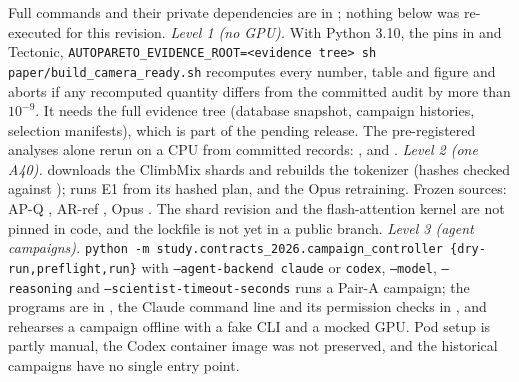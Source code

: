 Full commands and their private dependencies are in ; nothing below was re-executed for this revision.
\emph{Level 1 (no GPU).} With Python 3.10, the pins in  and Tectonic, \texttt{AUTOPARETO\_EVIDENCE\_ROOT=<evidence tree> sh paper/build\_camera\_ready.sh} recomputes every number, table and figure and aborts if any recomputed quantity differs from the committed audit by more than $10^{-9}$. It needs the full evidence tree (database snapshot, campaign histories, selection manifests), which is part of the pending release. The pre-registered analyses alone rerun on a CPU from committed records: ,  and .
\emph{Level 2 (one A40).}  downloads the ClimbMix shards and rebuilds the tokenizer (hashes checked against );  runs E1 from its hashed plan, and  the Opus retraining. Frozen sources: AP-Q , AR-ref , Opus . The shard revision and the flash-attention kernel are not pinned in code, and the lockfile is not yet in a public branch.
\emph{Level 3 (agent campaigns).} \texttt{python -m study.contracts\_2026.campaign\_controller \{dry-run,preflight,run\}} with \texttt{--agent-backend claude} or \texttt{codex}, \texttt{--model}, \texttt{--reasoning} and \texttt{--scientist-timeout-seconds} runs a Pair-A campaign; the programs are in , the Claude command line and its permission checks in , and  rehearses a campaign offline with a fake CLI and a mocked GPU. Pod setup is partly manual, the Codex container image was not preserved, and the historical campaigns have no single entry point.
